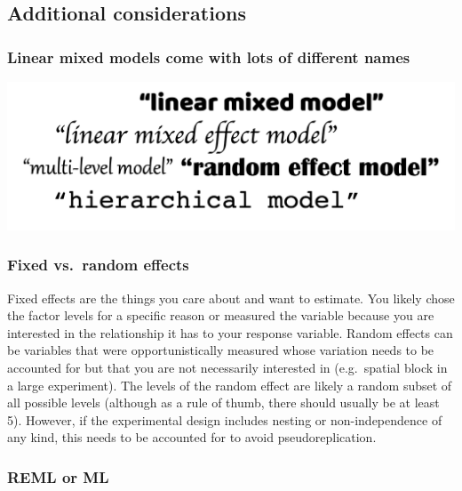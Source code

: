 \documentclass[
  openany]{book}
\begin{document}
\hypertarget{additional-considerations}{%
\subsection{Additional considerations}\label{additional-considerations}}

\hypertarget{linear-mixed-models-come-with-lots-of-different-names}{%
\subsubsection{Linear mixed models come with lots of different names}\label{linear-mixed-models-come-with-lots-of-different-names}}

\includegraphics{images/m3/names_for_lmm.png}

\hypertarget{fixed-vs.-random-effects}{%
\subsubsection{Fixed vs.~random effects}\label{fixed-vs.-random-effects}}

Fixed effects are the things you care about and want to estimate. You likely chose the factor levels for a specific reason or measured the variable because you are interested in the relationship it has to your response variable.
Random effects can be variables that were opportunistically measured whose variation needs to be accounted for but that you are not necessarily interested in (e.g.~spatial block in a large experiment). The levels of the random effect are likely a random subset of all possible levels (although as a rule of thumb, there should usually be at least 5). However, if the experimental design includes nesting or non-independence of any kind, this needs to be accounted for to avoid pseudoreplication.

\hypertarget{reml}{%
\subsubsection{REML or ML}\label{reml}}
\end{document}
